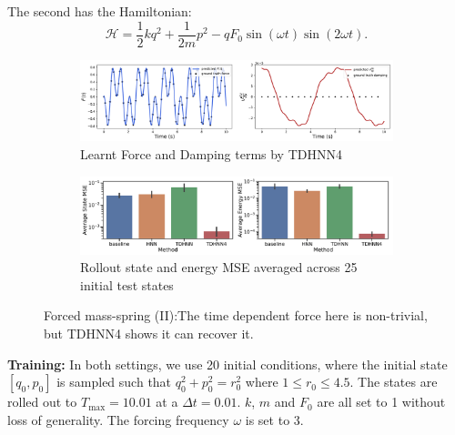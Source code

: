 \documentclass{article}
\begin{document}
The second has the Hamiltonian:
\begin{equation}
\mathcal{H} = \frac{1}{2}kq^2 + \frac{1}{2m}p^2 - qF_0\sin(\omega t)\sin(2\omega t).
\end{equation}
\begin{figure}[h!]
\centering
\captionsetup{justification=centering}
	\begin{subfigure}[b]{0.48\textwidth}
		\centering
		\includegraphics[width=\textwidth]{figures/figures/forced_mass_spring/2/forced_mass_spring_dpdt_new_0.pdf}
		\caption{Learnt Force and Damping terms by TDHNN4}
	\end{subfigure}
	\begin{subfigure}[b]{0.48\textwidth}
	    \centering
		\includegraphics[width=\textwidth]{figures/figures/forced_mass_spring/2/forced_mass_spring_errors_0.pdf}
		\caption{Rollout state and energy MSE averaged across 25 initial test states}
	\end{subfigure}
\caption{Forced mass-spring (II):The time dependent force here is non-trivial, but TDHNN4 shows it can recover it.}
\label{fig.fmspring2}
\end{figure}
\textbf{Training:} In both settings, we use 20 initial conditions, where the initial state $[q_0,p_0]$ is sampled such that $q_0^2 +p_0^2 =r_0^2$ where $1 \leq r_0 \leq 4.5$. The states are rolled out to $T_{\max}=10.01$ at a $\Delta t = 0.01$. $k$, $m$ and $F_0$ are all set to 1 without loss of generality. The forcing frequency $\omega$ is set to 3. 
\end{document}
